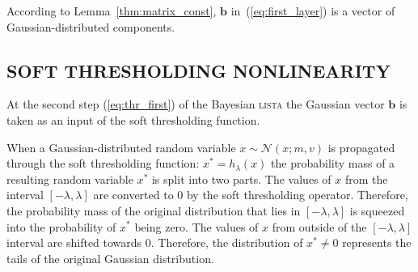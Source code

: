 \documentclass[letterpaper]{article}
\begin{document}
According to Lemma~\ref{thm:matrix_const}, $\mathbf{b}$ in~(\ref{eq:first_layer}) is a vector of Gaussian-distributed components.


\subsection{\uppercase{Soft thresholding nonlinearity}}
At the second step (\ref{eq:thr_first}) of the Bayesian \textsc{lista} the Gaussian vector $\mathbf{b}$ is taken as an input of the soft thresholding function.

When a Gaussian-distributed random variable $x \sim \mathcal{N}(x; m, v)$ is propagated through the soft thresholding function: $x^* = h_{\lambda}(x)$ the probability mass of a resulting random variable $x^*$ is split into two parts. The values of $x$ from the interval $[-\lambda, \lambda]$ are converted to $0$ by the soft thresholding operator. Therefore, the probability mass of the original distribution that lies in $[-\lambda, \lambda]$ is squeezed into the probability of $x^*$ being zero. The values of $x$ from outside of the $[-\lambda, \lambda]$ interval are shifted towards $0$. Therefore, the distribution of $x^* \neq 0$ represents the tails of the original Gaussian distribution.
 
\end{document}
